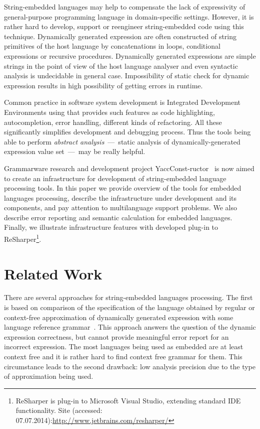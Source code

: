 \documentclass{acm_proc_article-sp}
\begin{document}
String-embedded languages may help to compensate the lack of expressivity of general-purpose programming language in domain-specific settings. However, it is rather hard to develop, support or reengineer string-embedded code using this technique. Dynamically generated expression are often constructed of string primitives of the host language by concatenations in loops, conditional expressions or recursive procedures. Dynamically generated expressions are simple strings in the point of view of the host language analyser and  even syntactic analysis is undecidable in general case. Impossibility of static check for dynamic expression results in high possibility of getting errors in runtime. 


Common practice in software system development is Integrated Development Environments using that provides such features as code highlighting, autocompletion, error handling, different kinds of refactoring. All these significantly simplifies development and debugging process. Thus the tools being able to perform {\it abstract analysis}~---~static analysis of dynamically-generated expression value set~---~may be really helpful.

Grammarware research and development project YaccConst-ructor~\cite{GrigorevKirilenkoYC} is now aimed to create an infrastructure for development of string-embedded language processing tools. In this paper we provide overview of the tools for embedded languages processing, describe the infrastructure under development and its components, and pay attention to multilanguage support problems. We also describe error reporting and semantic calculation for embedded languages. Finally, we illustrate infrastructure features with developed plug-in to ReSharper\footnote{ReSharper is plug-in to Microsoft Visual Studio, extending standard IDE functionality. Site (accessed: 07.07.2014):\url{http://www.jetbrains.com/resharper/}}. 


\section{Related Work}

There are several approaches for string-embedded languages processing. The first is based on comparison of the specification of the language obtained by regular or context-free approximation of dynamically generated expression with some language reference grammar~\cite{Minamide, StringExpr}. This approach answers the question of the dynamic expression correctness, but cannot provide meaningful error report for an incorrect expression. The most languages being used as embedded are at least context free and it is rather hard to find context free grammar for them. This circumstance leads to the second drawback: low analysis precision due to the type of approximation being used.
\end{document}
